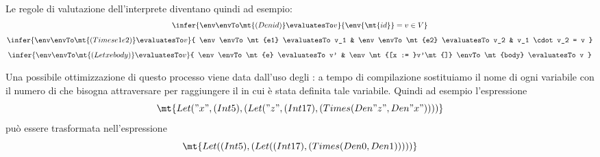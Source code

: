 Le regole di valutazione dell'interprete diventano quindi ad esempio:
\begin{gather*}
    \infer{\env \envTo \mt{(Den id)} \evaluatesTo v}{\env{\mt{id}} = v \in V}\\[5pt]
    \infer{
        \env \envTo \mt{(Times e1 e2)} \evaluatesTo v
    }{
        \env \envTo \mt{e1} \evaluatesTo v_1 &
        \env \envTo \mt{e2} \evaluatesTo v_2 &
        v_1 \cdot v_2 = v
    }\\[5pt]
    \infer{
        \env \envTo \mt{(Let x e body)} \evaluatesTo v
    }{
        \env \envTo \mt{e} \evaluatesTo v' &
        \env\mt{[x := }v'\mt{]} \envTo \mt{body} \evaluatesTo v 
    }
\end{gather*}

Una possibile ottimizzazione di questo processo viene data dall'uso degli : a tempo di compilazione sostituiamo il nome di ogni variabile con il numero di  che bisogna attraversare per raggiungere il  in cui è stata definita tale variabile. Quindi ad esempio l'espressione \[
    \mt{Let ("x", (Int 5), (Let ("z", (Int 17), (Times (Den "z", Den "x"))))}    
\] può essere trasformata nell'espressione \[
    \mt{Let ((Int 5), (Let ((Int 17), (Times (Den 0, Den 1)))))}    
\]

